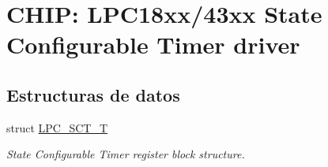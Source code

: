 \hypertarget{group___s_c_t__18_x_x__43_x_x}{}\section{C\+H\+IP\+: L\+P\+C18xx/43xx State Configurable Timer driver}
\label{group___s_c_t__18_x_x__43_x_x}
\subsection*{Estructuras de datos}
\begin{DoxyCompactItemize}
\item 
struct \hyperlink{struct_l_p_c___s_c_t___t}{L\+P\+C\+\_\+\+S\+C\+T\+\_\+T}
\begin{DoxyCompactList}\small\item\em State Configurable Timer register block structure. \end{DoxyCompactList}\end{DoxyCompactItemize}
